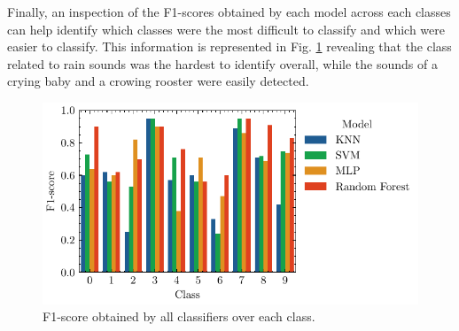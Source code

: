 \documentclass[journal]{IEEEtran}
\begin{document}
Finally, an inspection of the F1-scores obtained by each model across each classes can help identify which classes were the most difficult to classify and which were easier to classify. This information is represented in Fig. \ref{fig:class_f1} revealing that the class related to rain sounds was the hardest to identify overall, while the sounds of a crying baby and a crowing rooster were easily detected.
\begin{figure}[t]
    \centering
    \includegraphics[width=\linewidth]{class_f1.pdf}
    \caption{F1-score obtained by all classifiers over each class.}
    \label{fig:class_f1}
\end{figure}


%
%

\end{document}
